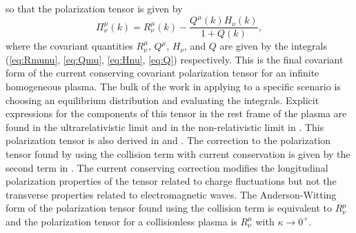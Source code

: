 so that the polarization tensor is given by
\begin{equation}\label{eq:pimunu}
\boxed{\Pi^\mu_\nu(k) = R^\mu_\nu(k) - \frac{Q^\mu(k) H_\nu(k)}{1+Q(k)},}
\end{equation}
where the covariant quantities $R^\mu_\nu$, $Q^\mu$, $H_\nu$, and $Q$ are given by the integrals (\ref{eq:Rmunu}, \ref{eq:Qmu}, \ref{eq:Hnu}, \ref{eq:Q}) respectively. 
This is the final covariant form of the current conserving covariant polarization tensor for an infinite homogeneous plasma. The bulk of the work in applying  to a specific scenario is choosing an equilibrium distribution and evaluating the integrals. Explicit expressions for the components of this tensor in the rest frame of the plasma are found in the ultrarelativistic limit  and in the non-relativistic limit  in \cite{Formanek:2021blc}.
This polarization tensor is also derived in \cite{Carrington:2003je} and \cite{Schenke:2006xu}. The correction to the polarization tensor found by using the collision term with current conservation  is given by the second term in . The current conserving correction modifies the longitudinal polarization properties of the tensor related to charge fluctuations but not the transverse properties related to electromagnetic waves. The Anderson-Witting form of the polarization tensor found using the collision term  is equivalent to $R^\mu_\nu$ and the polarization tensor for a collisionless plasma is $R^\mu_\nu$ with $\kappa \rightarrow 0^+$.




